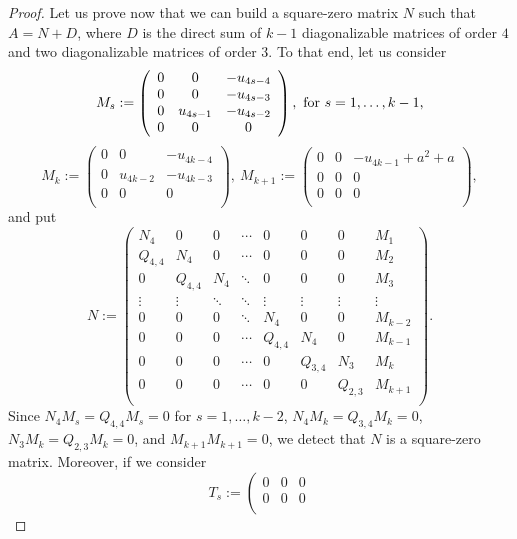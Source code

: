 \documentclass{amsart}
\theoremstyle{definition}
\theoremstyle{remark}
\numberwithin{equation}{section}
\begin{document}
\begin{proof}
Let us prove now that we can build a square-zero matrix $N$ such that $A=N+D$, where $D$ is the direct sum of $k-1$ diagonalizable matrices of order $4$ and two diagonalizable matrices of order $3$. To that end, let us consider
$$M_s:=\left(
   \begin{array}{ccc}
     0 & 0 &-u_{4s-4}\\
     0 & 0 &-u_{4s-3}\\
     0 & u_{4s-1} &-u_{4s-2}\\
     0 & 0 &0\\
   \end{array}
 \right),\hbox{ for $s=1,\dots, k-1$,}
$$
$$M_k:=\left(
   \begin{array}{ccc}
     0 & 0 &-u_{4k-4}\\
     0 & u_{4k-2} &-u_{4k-3}\\
     0 & 0 &0\\
   \end{array}
 \right),\ M_{k+1}:=\left(
   \begin{array}{ccc}
     0 & 0 &-u_{4k-1}+a^2+a\\
     0 & 0 &0\\
     0 & 0 &0\\
   \end{array}
 \right),$$
and put
$$N:=\left(
      \begin{array}{cccccccc}
        N_4 & 0 & 0&\cdots & 0 & 0 & 0 & M_1 \\
        Q_{4,4} & N_4 &0& \cdots & 0 & 0 & 0 & M_2 \\
        0 & Q_{4,4} & N_4&\ddots & 0 & 0 & 0 & M_3 \\
        \vdots & \vdots& \ddots & \ddots & \vdots &\vdots & \vdots & \vdots \\
        0 & 0& 0 & \ddots & N_4 & 0 & 0 & M_{k-2} \\
        0 & 0& 0 & \cdots & Q_{4,4} & N_4 & 0 & M_{k-1} \\
        0 & 0& 0 & \cdots & 0 & Q_{3,4} & N_3 & M_{k} \\
        0 & 0& 0 & \cdots & 0 & 0 & Q_{2,3} & M_{k+1} \\
      \end{array}
    \right).$$
Since  $N_4 M_s=Q_{4,4} M_s=0$ for $s=1,\dots, k-2$, $N_4M_k=Q_{3,4}M_k=0$, $N_3M_k=Q_{2,3}M_k=0$, and $M_{k+1} M_{k+1}=0$, we detect that $N$ is a square-zero matrix. Moreover, if we consider
$$T_s:=\left(
    \begin{array}{ccc}
       0 & 0 & 0 \\
       0 & 0 & 0 \\

\end{array}$$
\end{proof}
\end{document}
